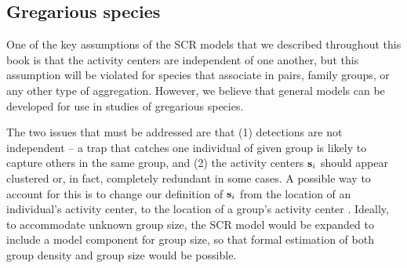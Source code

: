 \subsection{Gregarious species}

One of the key assumptions of the SCR models that we described
throughout this book is that the activity centers are independent of
one another, but this assumption will be violated for %
species that associate in pairs, family groups, or any other type of
aggregation. %
However, we believe that general
models %
can be developed for
use in studies of gregarious species.

The two issues that must be addressed are that (1)
detections are not independent -- a trap that
catches one individual of given group is likely to capture others in the same
group, and (2)
the activity centers ${\bf s}_{i}$
should appear clustered or, in fact, completely redundant in some
cases. A possible way to account for this is to change our definition
of ${\bf s}_i$ from the location of an individual's activity center,
to the location of a group's activity center
\citep{russell_etal:2012}. Ideally, to accommodate unknown group size,
the SCR model would be expanded to include a model component for group size,
so that formal estimation of both group density and group size would
be possible.


